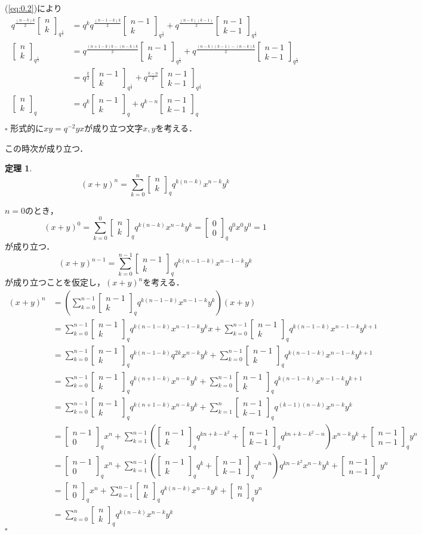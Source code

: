 \documentclass{article}
\makeatletter
\theoremstyle{definition}
\newtheorem{theorem}{定理}[section]
\renewenvironment{proof}[1][(証明)]{\par
  \normalfont
  \topsep6\p@\@plus6\p@ \trivlist
  \item[\hskip\labelsep{#1}]\ignorespaces
}{\hfill$\square$\endtrivlist}	%
\numberwithin{equation}{section}
\newcommand{\1}{\mathbb{1}}
\newcommand{\2}{\mathbb{2}}
\renewcommand{\.}{\hspace{2mm}}
\newcommand{\qBinom}[3]{
  \begin{bmatrix}
    #1 \\
    #2
  \end{bmatrix}_{#3}
}
\makeatother
\begin{document}
\begin{proof}
  (\ref{eq:0.2})により
  \begin{align*}
    q^\frac{(n-k)k}{2}\qBinom{n}{k}{q^\frac{1}{2}}&=q^kq^\frac{(n-1-k)k}{2}\qBinom{n-1}{k}{q^\frac{1}{2}}+q^\frac{(n-k)(k-1)}{2}\qBinom{n-1}{k-1}{q^\frac{1}{2}}\\
    \qBinom{n}{k}{q^\frac{1}{2}}&=q^\frac{(n+1-k)k-(n-k)k}{2}\qBinom{n-1}{k}{q^\frac{1}{2}}+q^\frac{(n-k)(k-1)-(n-k)k}{2}\qBinom{n-1}{k-1}{q^\frac{1}{2}}\\
    &=q^\frac{k}{2}\qBinom{n-1}{k}{q^\frac{1}{2}}+q^\frac{k-n}{2}\qBinom{n-1}{k-1}{q^\frac{1}{2}}\\
    \qBinom{n}{k}{q}&=q^k\qBinom{n-1}{k}{q}+q^{k-n}\qBinom{n-1}{k-1}{q}\\
  \end{align*}
\end{proof}
形式的に$xy=q^{-2}yx$が成り立つ文字$x,y$を考える．

この時次が成り立つ．
\begin{theorem}
  \[
    (x+y)^n=\sum_{k=0}^{n}\qBinom{n}{k}{q}q^{k(n-k)}x^{n-k}y^k
  \]
\end{theorem}
\begin{proof}
  $n=0$のとき，
  \[
    (x+y)^0=\sum_{k=0}^{0}\qBinom{n}{k}{q}q^{k(n-k)}x^{n-k}y^k=\qBinom{0}{0}{q}q^0x^0y^0=1
  \]
  が成り立つ．
  \[
    (x+y)^{n-1}=\sum_{k=0}^{n-1}\qBinom{n-1}{k}{q}q^{k(n-1-k)}x^{n-1-k}y^k
  \]
  が成り立つことを仮定し，$(x+y)^n$を考える．
  \begin{align*}
    (x+y)^n&=\left(\sum_{k=0}^{n-1}\qBinom{n-1}{k}{q}q^{k(n-1-k)}x^{n-1-k}y^k\right)(x+y)\\
    &=\sum_{k=0}^{n-1}\qBinom{n-1}{k}{q}q^{k(n-1-k)}x^{n-1-k}y^kx + \sum_{k=0}^{n-1}\qBinom{n-1}{k}{q}q^{k(n-1-k)}x^{n-1-k}y^{k+1}\\
    &=\sum_{k=0}^{n-1}\qBinom{n-1}{k}{q}q^{k(n-1-k)}q^{2k}x^{n-k}y^k + \sum_{k=0}^{n-1}\qBinom{n-1}{k}{q}q^{k(n-1-k)}x^{n-1-k}y^{k+1}\\
    &=\sum_{k=0}^{n-1}\qBinom{n-1}{k}{q}q^{k(n+1-k)}x^{n-k}y^k + \sum_{k=0}^{n-1}\qBinom{n-1}{k}{q}q^{k(n-1-k)}x^{n-1-k}y^{k+1}\\
    &=\sum_{k=0}^{n-1}\qBinom{n-1}{k}{q}q^{k(n+1-k)}x^{n-k}y^k + \sum_{k=1}^{n}\qBinom{n-1}{k-1}{q}q^{(k-1)(n-k)}x^{n-k}y^{k}\\
    &=\qBinom{n-1}{0}{q}x^n+\sum_{k=1}^{n-1} \left(\qBinom{n-1}{k}{q}q^{kn+k-k^2}+\qBinom{n-1}{k-1}{q}q^{kn+k-k^2-n}\right)x^{n-k}y^k + \qBinom{n-1}{n-1}{q}y^n\\
    &=\qBinom{n-1}{0}{q}x^n+\sum_{k=1}^{n-1} \left(\qBinom{n-1}{k}{q}q^k+\qBinom{n-1}{k-1}{q}q^{k-n}\right)q^{kn-k^2}x^{n-k}y^k + \qBinom{n-1}{n-1}{q}y^n\\
    &=\qBinom{n}{0}{q}x^n+\sum_{k=1}^{n-1} \qBinom{n}{k}{q}q^{k(n-k)}x^{n-k}y^k + \qBinom{n}{n}{q}y^n\\
    &=\sum_{k=0}^n \qBinom{n}{k}{q}q^{k(n-k)}x^{n-k}y^k
  \end{align*}
\end{proof}
\end{document}
